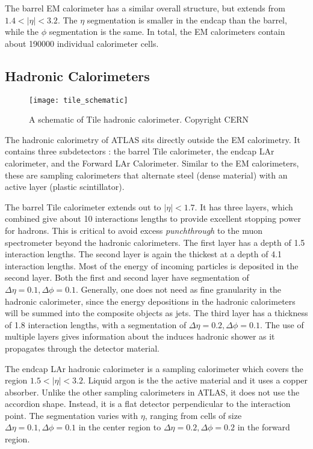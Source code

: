 The barrel EM calorimeter has a similar overall structure, but extends from $1.4 < |\eta| < 3.2$.
The $\eta$ segmentation is smaller in the endcap than the barrel, while the $\phi$ segmentation is the same.
In total, the EM calorimeters contain about 190000 individual calorimeter cells.


\subsection{Hadronic Calorimeters}
\begin{figure}[tbp]
\caption{A schematic of Tile hadronic calorimeter. Copyright CERN} \label{fig:tile_schematic}
\texttt{[image: tile\_schematic]}
\end{figure}

The hadronic calorimetry of ATLAS sits directly outside the EM calorimetry.
It contains three subdetectors : the barrel Tile calorimeter, the endcap LAr calorimeter, and the Forward  LAr Calorimeter.
Similar to the EM calorimeters, these are sampling calorimeters that alternate steel (dense material) with an active layer (plastic scintillator).

The barrel Tile calorimeter extends out to $|\eta| < 1.7$.
It has three layers, which combined give about 10 interactions lengths to provide excellent stopping power for hadrons.
This is critical to avoid excess \textit{punchthrough} to the muon spectrometer beyond the hadronic calorimeters.
The first layer has a depth of 1.5 interaction lengths.
The second layer is again the thickest at a depth of 4.1 interaction lengths.
Most of the energy of incoming particles is deposited in the second layer.
Both the first and second layer have segmentation of $\Delta\eta = 0.1, \Delta\phi = 0.1$.
Generally, one does not need as fine granularity in the hadronic calorimeter, since the energy depositions in the hadronic calorimeters will be summed into the composite objects as jets.
The third layer has a thickness of 1.8 interaction lengths, with a segmentation of $\Delta\eta = 0.2, \Delta\phi = 0.1$.
The use of multiple layers gives information about the induces hadronic shower as it propagates through the detector material.

The endcap LAr hadronic calorimeter is a sampling calorimeter which covers the region $1.5 < |\eta| < 3.2$.
Liquid argon is the the active material and it uses a copper absorber.
Unlike the other sampling calorimeters in ATLAS, it does not use the accordion shape.
Instead, it is a flat detector perpendicular to the interaction point.
The segmentation varies with $\eta$, ranging from cells of size $\Delta\eta = 0.1, \Delta\phi = 0.1$ in the center region to $\Delta\eta = 0.2, \Delta\phi = 0.2$ in the forward region.

